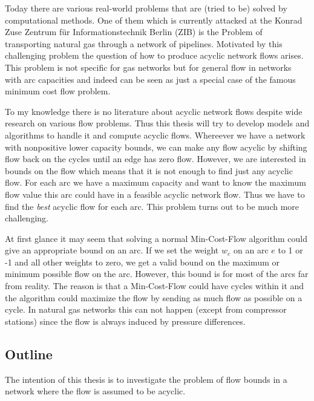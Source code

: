
Today there are various real-world problems that are (tried to be) solved by computational methods. One of them which 
is currently attacked at the Konrad Zuse Zentrum für Informationstechnik Berlin (ZIB) is the Problem of transporting 
natural gas through a network of pipelines. Motivated by this challenging problem the question of how to produce 
acyclic network flows arises. This problem is not specific for gas networks but for general flow in networks with arc 
capacities and indeed can be seen as just a special case of the famous minimum cost flow problem. 

To my knowledge there is no literature about acyclic network flows despite wide research on various flow problems. 
Thus this thesis will try to develop models and algorithms to handle it and compute acyclic flows.
Whereever we have a network with nonpositive lower capacity bounds, we can make any flow acyclic by shifting flow 
back on the cycles until an edge has zero flow. 
However, we are interested in bounds on the flow which means that it is not enough to find just any acyclic flow. 
For each arc we have a maximum 
capacity and want to know the maximum flow value this arc could have in a feasible acyclic network flow. Thus 
we have to find the \textit{best} acyclic flow for each arc. This problem turns out to be much more challenging.


At first glance it may seem that solving a normal Min-Cost-Flow algorithm could give an appropriate bound 
on an arc. If we set the weight $w_e$ on an arc $e$ to 1 or -1 and all other weights to zero, we get 
a valid bound on the maximum or minimum possible flow on the arc. However, this bound is for most of the arcs far from 
reality. The reason is that a Min-Cost-Flow could have cycles within it and the algorithm could maximize the flow by 
sending as much flow as possible on a cycle. In natural gas networks this can not happen (except from compressor 
stations) since the flow is always induced by pressure differences.\\

\subsection{Outline}
The intention of this thesis is to investigate the problem of flow bounds in a network where the flow is assumed to be 
acyclic. 

